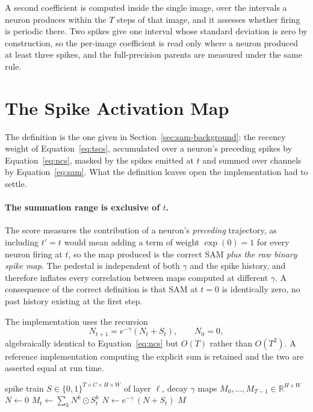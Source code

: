 A second coefficient is computed inside the single image, over the intervals a
neuron produces within the $T$ steps of that image, and it assesses whether
firing is periodic there. Two
spikes give one interval whose standard deviation is zero by construction, so
the per-image coefficient is read only where a neuron produced at least three
spikes, and the full-precision parents are measured under the same rule.
 
\section{The Spike Activation Map}
\label{sec:sam-method}
 
The definition is the one given in Section~\ref{sec:sam-background}: the
recency weight of Equation~\ref{eq:tscs}, accumulated over a neuron's preceding
spikes by Equation~\ref{eq:ncs}, masked by the spikes emitted at $t$ and summed
over channels by Equation~\ref{eq:sam}. What the definition leaves open the
implementation had to settle.

\paragraph{The summation range is exclusive of $t$.} The score measures the contribution of a neuron's
\emph{preceding} trajectory, as including $t' = t$ would mean adding a term of weight
$\exp(0) = 1$ for every neuron firing at $t$, so the map produced is the correct
SAM \emph{plus the raw binary spike map}. The pedestal is independent of both
$\gamma$ and the spike history, and therefore inflates every correlation between
maps computed at different $\gamma$. A consequence of the correct definition is
that SAM at $t = 0$ is identically zero, no past history existing at the first
step.
 
The implementation uses the recursion
\begin{equation}
N_{t+1} = e^{-\gamma}\left(N_{t} + S_{t}\right), \qquad N_0 = 0,
\end{equation}
algebraically identical to Equation~\ref{eq:ncs} but $O(T)$ rather than
$O(T^2)$. A reference implementation computing the explicit sum is retained and
the two are asserted equal at run time.


\begin{algorithm}[htbp]
\caption{Spike Activation Map of one image at one layer}
\label{alg:sam}
\begin{algorithmic}[1]
\REQUIRE spike train $S \in \{0,1\}^{T \times C \times H \times W}$ of layer $\ell$,
         decay $\gamma$
\ENSURE  maps $M_0, \dots, M_{T-1} \in \mathbb{R}^{H \times W}$
\STATE $N \gets 0$ 
  \STATE $M_t \gets \sum_{k} N^{k} \odot S^{k}_{t}$ 
  \STATE $N \gets e^{-\gamma}\,(N + S_t)$ 
\ENDFOR
\RETURN $M$
\end{algorithmic}
\end{algorithm}
 
